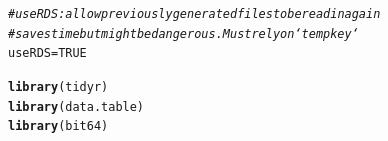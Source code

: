 \documentclass{scrreprt}\usepackage[]{graphicx}\usepackage[]{color}
\makeatletter
\newcommand{\hlnum}[1]{\textcolor[rgb]{0.686,0.059,0.569}{#1}}%
\newcommand{\hlcom}[1]{\textcolor[rgb]{0.678,0.584,0.686}{\textit{#1}}}%
\newcommand{\hlstd}[1]{\textcolor[rgb]{0.345,0.345,0.345}{#1}}%
\newcommand{\hlkwb}[1]{\textcolor[rgb]{0.69,0.353,0.396}{#1}}%
\newcommand{\hlkwd}[1]{\textcolor[rgb]{0.737,0.353,0.396}{\textbf{#1}}}%
\newenvironment{kframe}{%
 \def\at@end@of@kframe{}%
 \ifinner\ifhmode%
  \def\at@end@of@kframe{\end{minipage}}%
  \begin{minipage}{\columnwidth}%
 \fi\fi%
 \def\FrameCommand##1{\hskip\@totalleftmargin \hskip-\fboxsep
 \colorbox{shadecolor}{##1}\hskip-\fboxsep
     \hskip-\linewidth \hskip-\@totalleftmargin \hskip\columnwidth}%
 \MakeFramed {\advance\hsize-\width
   \@totalleftmargin\z@ \linewidth\hsize
   \@setminipage}}%
 {\par\unskip\endMakeFramed%
 \at@end@of@kframe}
\newenvironment{knitrout}{}{} %
\makeatother
\begin{document}
\begin{knitrout}
\color{fgcolor}\begin{kframe}
\begin{alltt}
\hlcom{# use RDS: allow previously generated files to be read in again}
\hlcom{# saves time but might be dangerous. Must rely on `tempkey`}
\hlstd{useRDS} \hlkwb{=} \hlnum{TRUE}
\end{alltt}
\end{kframe}
\end{knitrout}

\begin{knitrout}
\color{fgcolor}\begin{kframe}
\begin{alltt}
\hlkwd{library}\hlstd{(tidyr)}
\hlkwd{library}\hlstd{(data.table)}
\hlkwd{library}\hlstd{(bit64)}
\end{alltt}



\end{kframe}
\end{knitrout}
\end{document}
